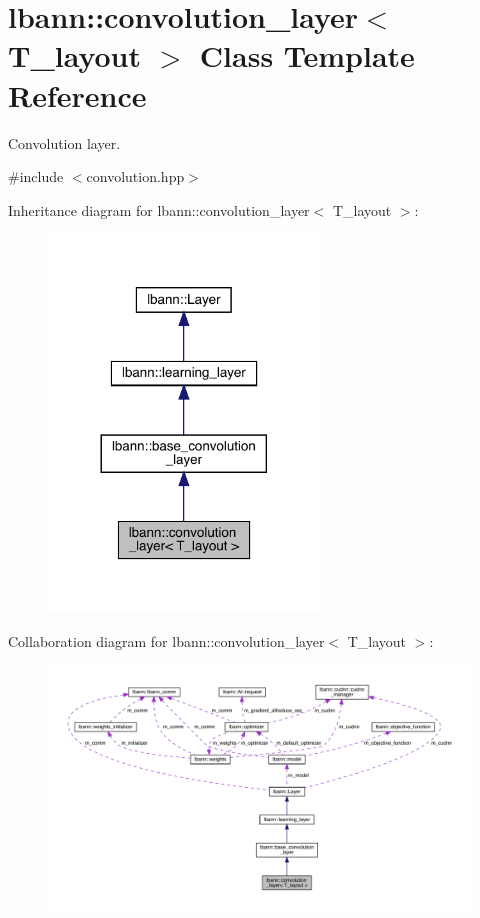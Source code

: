 \hypertarget{classlbann_1_1convolution__layer}{}\section{lbann\+:\+:convolution\+\_\+layer$<$ T\+\_\+layout $>$ Class Template Reference}
\label{classlbann_1_1convolution__layer}


Convolution layer.  




{\ttfamily \#include $<$convolution.\+hpp$>$}



Inheritance diagram for lbann\+:\+:convolution\+\_\+layer$<$ T\+\_\+layout $>$\+:\nopagebreak
\begin{figure}[H]
\begin{center}
\leavevmode
\includegraphics[width=204pt]{classlbann_1_1convolution__layer__inherit__graph}
\end{center}
\end{figure}


Collaboration diagram for lbann\+:\+:convolution\+\_\+layer$<$ T\+\_\+layout $>$\+:\nopagebreak
\begin{figure}[H]
\begin{center}
\leavevmode
\includegraphics[width=350pt]{classlbann_1_1convolution__layer__coll__graph}
\end{center}
\end{figure}
